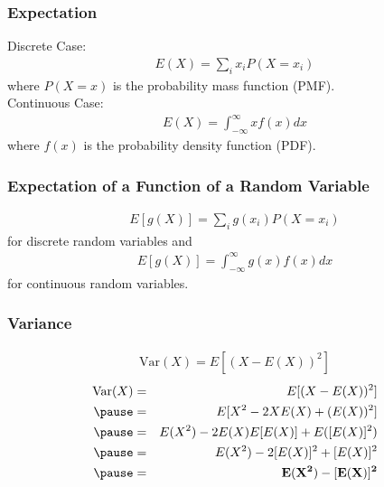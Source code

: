 \documentclass{beamer}
\begin{document}
\begin{frame}
\frametitle{Expectation}
\pause
Discrete Case:
\pause
\begin{eqnarray*}
E(X) = \sum_i x_i P(X = x_i)
\end{eqnarray*}
where $P(X = x)$ is the probability mass function (PMF).\\
\pause
\bigskip
Continuous Case:
\pause
\begin{eqnarray*}
E(X) = \int^{\infty}_{-\infty} x f(x) dx
\end{eqnarray*}
where $f(x)$ is the probability density function (PDF).
\end{frame}

\begin{frame}
\frametitle{Expectation of a Function of a Random Variable}
\pause
\begin{eqnarray*}
E[g(X)] = \sum_i g(x_i) P(X = x_i)
\end{eqnarray*}
for discrete random variables \pause and 
\begin{eqnarray*}
E[g(X)] = \int_{-\infty}^{\infty} g(x) f(x) dx
\end{eqnarray*}
for continuous random variables.  \\
\bigskip
\pause
\end{frame}

\begin{frame}
\frametitle{Variance}
\pause
\begin{eqnarray*}
\mathrm{Var}(X) = E[(X - E(X))^2]
\end{eqnarray*}
\pause
\begin{eqnarray*}
\mathrm{Var}(X) &=& E[(X - E(X))^2]\\
\pause
&=& E[X^2 - 2 X E(X) + (E(X))^2]\\
\pause
&=& E(X^2) - 2 E(X) E[E(X)] + E([E(X)]^2)\\
\pause
&=& E(X^2) - 2 [E(X)]^2 + [E(X)]^2\\
\pause
&=& \mathbf{E(X^2) - [E(X)]^2}
\end{eqnarray*}
\pause
\end{frame}
\end{document}
